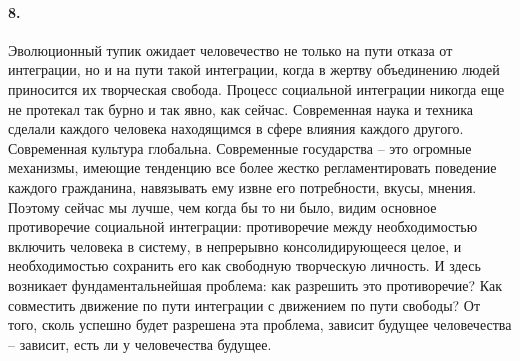 \documentclass{book}
\begin{document}
\paragraph{8.} Эволюционный тупик ожидает человечество не только на пути отказа от интеграции, но и на пути такой интеграции, когда в жертву объединению людей приносится их творческая свобода. Процесс социальной интеграции никогда еще не протекал так бурно и так явно, как сейчас. Современная наука и техника сделали каждого человека находящимся в сфере влияния каждого другого. Современная культура глобальна. Современные государства -- это огромные механизмы, имеющие тенденцию все более жестко регламентировать поведение каждого гражданина, навязывать ему извне его потребности, вкусы, мнения. Поэтому сейчас мы лучше, чем когда бы то ни было, видим основное противоречие социальной интеграции: противоречие между необходимостью включить человека в систему, в непрерывно консолидирующееся целое, и необходимостью сохранить его как свободную творческую личность. И здесь возникает фундаментальнейшая проблема: как разрешить это противоречие? Как совместить движение по пути интеграции с движением по пути свободы? От того,
 сколь успешно будет разрешена эта проблема, зависит будущее человечества -- зависит, есть ли у человечества будущее.
\end{document}

